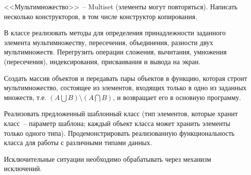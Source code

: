
<<Мультимножество>>~-- Multiset (элементы могут повторяться). Написать несколько
конструкторов, в том числе конструктор копирования.

В классе реализовать методы для
определения принадлежности заданного элемента мультимножеству, пересечения,
объединения, разности двух мультимножеств. Перегрузить операции сложения,
вычитания, умножения (пересечения), индексирования, присваивания и вывода на экран.

Создать массив объектов и передавать пары объектов в функцию, которая строит
мультимножество, состоящее из элементов, входящих только в одно из заданных
множеств, т.е. $(A\bigcup B) \setminus (A\bigcap B)$, и возвращает его в основную программу.

Реализовать предложенный шаблонный класс (тип элементов, которые
хранит класс~-- параметр шаблона; каждый объект класса может хранить
элементы только одного типа). Продемонстрировать реализованную
функциональность класса для работы с различными типами данных.


Исключительные ситуации необходимо обрабатывать через механизм исключений.
